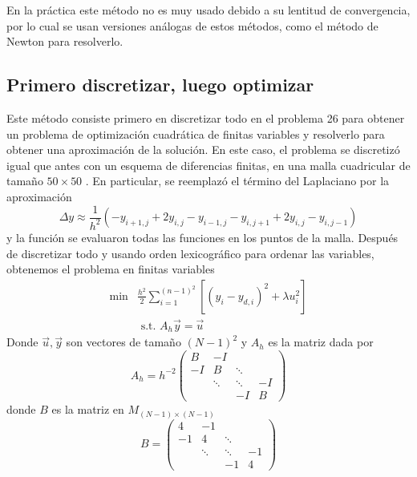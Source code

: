 \documentclass{article}
\begin{document}
\noindent
En la práctica este método no es muy usado debido a su lentitud de convergencia, por lo cual se usan versiones análogas de estos métodos, como el método de Newton para resolverlo. 
\subsection{Primero discretizar, luego optimizar}
Este método consiste primero en discretizar todo en el problema 26 para obtener un problema de optimización cuadrática de finitas variables y resolverlo para obtener una aproximación de la solución. En este caso, el problema se discretizó igual que antes con un esquema de diferencias finitas, en una malla cuadricular de tamaño $50\times 50$ . En particular, se reemplazó el término del Laplaciano por la aproximación
\begin{equation}
\Delta y\approx \frac{1}{h^{2}}\left(-y_{i+1, j}+2 y_{i, j}-y_{i-1, j}-y_{i, j+1}+2 y_{i, j}-y_{i, j-1}\right)
\end{equation}
y la función se evaluaron todas las funciones en los puntos de la malla. Después de discretizar todo y usando orden lexicográfico para ordenar las variables, obtenemos el problema en finitas variables 
\begin{equation}
\begin{split}
  \min& \frac{h^2}{2} \sum_{i=1}^{(n-1)^{2}}\left[\left(y_{i}-y_{d,i}\right)^{2}+\lambda u_{i}^{2}\right]\\
  &\text{ s.t. } A_h \vec{y}= \Vec{u}
\end{split}
\end{equation}
Donde $\vec{u},\vec{y}$ son vectores de tamaño $(N-1)^2$ y $A_h$ es la matriz dada por 
\begin{equation}A_{h}=h^{-2}\left(\begin{array}{cccc}
B & -I & & \\
-I & B & \ddots & \\
& \ddots & \ddots & -I \\
& & -I & B
\end{array}\right)\end{equation}
donde $B$ es la matriz en $M_{(N-1)\times (N-1)}$
\begin{equation}B=\left(\begin{array}{cccc}
4 & -1 & & \\
-1 & 4 & \ddots & \\
& \ddots & \ddots & -1 \\
& & -1 & 4
\end{array}\right)\end{equation}
\end{document}
